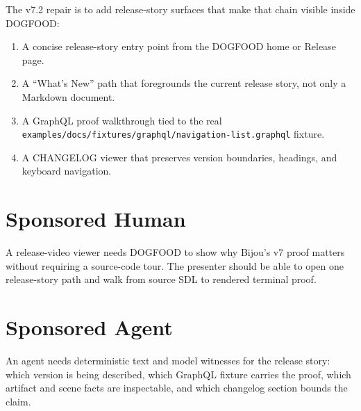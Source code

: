 

The v7.2 repair is to add release-story surfaces that make that chain visible inside DOGFOOD:

\begin{enumerate}
\def\labelenumi{\arabic{enumi}.}
\tightlist
\item
  A concise release-story entry point from the DOGFOOD home or Release page.
\item
  A ``What's New'' path that foregrounds the current release story, not only a Markdown document.
\item
  A GraphQL proof walkthrough tied to the real \texttt{e\allowbreak{}x\allowbreak{}a\allowbreak{}m\allowbreak{}p\allowbreak{}l\allowbreak{}e\allowbreak{}s\allowbreak{}/\allowbreak{}d\allowbreak{}o\allowbreak{}c\allowbreak{}s\allowbreak{}/\allowbreak{}f\allowbreak{}i\allowbreak{}x\allowbreak{}t\allowbreak{}u\allowbreak{}r\allowbreak{}e\allowbreak{}s\allowbreak{}/\allowbreak{}g\allowbreak{}r\allowbreak{}a\allowbreak{}p\allowbreak{}h\allowbreak{}q\allowbreak{}l\allowbreak{}/\allowbreak{}n\allowbreak{}a\allowbreak{}v\allowbreak{}i\allowbreak{}g\allowbreak{}a\allowbreak{}t\allowbreak{}i\allowbreak{}o\allowbreak{}n\allowbreak{}-\allowbreak{}l\allowbreak{}i\allowbreak{}s\allowbreak{}t\allowbreak{}.\allowbreak{}g\allowbreak{}r\allowbreak{}a\allowbreak{}p\allowbreak{}h\allowbreak{}q\allowbreak{}l} fixture.
\item
  A CHANGELOG viewer that preserves version boundaries, headings, and keyboard navigation.
\end{enumerate}

\section{Sponsored Human}\label{record-118-sponsored-human}

A release-video viewer needs DOGFOOD to show why Bijou's v7 proof matters without requiring a source-code tour. The presenter should be able to open one release-story path and walk from source SDL to rendered terminal proof.

\section{Sponsored Agent}\label{record-118-sponsored-agent}

An agent needs deterministic text and model witnesses for the release story: which version is being described, which GraphQL fixture carries the proof, which artifact and scene facts are inspectable, and which changelog section bounds the claim.


